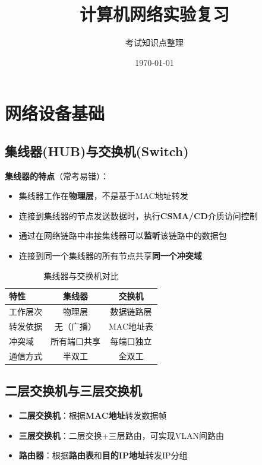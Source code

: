 \documentclass[12pt,a4paper]{ctexart}
\title{\Huge\textbf{计算机网络实验复习}}
\author{考试知识点整理}
\date{\today}
\begin{document}
\maketitle

\tableofcontents
\newpage

\section{网络设备基础}

\subsection{集线器(HUB)与交换机(Switch)}

\begin{keybox}
\textbf{集线器的特点}（常考易错）：
\begin{itemize}[itemsep=0pt]
    \item 集线器工作在\textbf{物理层}，不是基于MAC地址转发
    \item 连接到集线器的节点发送数据时，执行\textbf{CSMA/CD}介质访问控制
    \item 通过在网络链路中串接集线器可以\textbf{监听}该链路中的数据包
    \item 连接到同一个集线器的所有节点共享\textbf{同一个冲突域}
\end{itemize}
\end{keybox}

\begin{table}[htbp]
\centering
\begin{tabular}{lcc}
\toprule
\textbf{特性} & \textbf{集线器} & \textbf{交换机} \\
\midrule
工作层次 & 物理层 & 数据链路层 \\
转发依据 & 无（广播） & MAC地址表 \\
冲突域 & 所有端口共享 & 每端口独立 \\
通信方式 & 半双工 & 全双工 \\
\bottomrule
\end{tabular}
\caption{集线器与交换机对比}
\end{table}

\subsection{二层交换机与三层交换机}

\begin{itemize}[leftmargin=2em,itemsep=0pt]
    \item \textbf{二层交换机}：根据\textbf{MAC地址}转发数据帧
    \item \textbf{三层交换机}：二层交换+三层路由，可实现VLAN间路由
    \item \textbf{路由器}：根据\textbf{路由表}和\textbf{目的IP地址}转发IP分组
\end{itemize}
\end{document}
